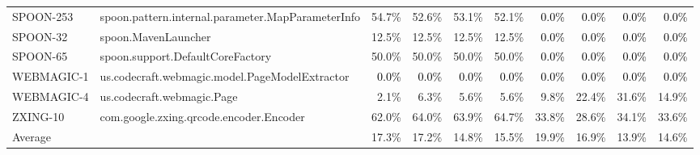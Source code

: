 \begin{tabular}{ ll rrrr rrrr}
SPOON-253  &  spoon.pattern.internal.parameter.MapParameterInfo & 54.7\% & 52.6\% & 53.1\% & 52.1\% & \cellcolor{light-gray} \textcolor{black}{0.0\%} & \cellcolor{light-gray} \textcolor{black}{0.0\%} & \cellcolor{light-gray} \textcolor{black}{0.0\%} & \cellcolor{light-gray} \textcolor{black}{0.0\%}\\ 
SPOON-32  &  spoon.MavenLauncher & 12.5\% & 12.5\% & 12.5\% & 12.5\% & \cellcolor{light-gray} \textcolor{black}{0.0\%} & \cellcolor{light-gray} \textcolor{black}{0.0\%} & \cellcolor{light-gray} \textcolor{black}{0.0\%} & \cellcolor{light-gray} \textcolor{black}{0.0\%}\\ 
SPOON-65  &  spoon.support.DefaultCoreFactory & 50.0\% & 50.0\% & 50.0\% & 50.0\% & \cellcolor{light-gray} \textcolor{black}{0.0\%} & \cellcolor{light-gray} \textcolor{black}{0.0\%} & \cellcolor{light-gray} \textcolor{black}{0.0\%} & \cellcolor{light-gray} \textcolor{black}{0.0\%}\\ 
WEBMAGIC-1  &  us.codecraft.webmagic.model.PageModelExtractor & \cellcolor{light-gray} \textcolor{black}{0.0\%} & \cellcolor{light-gray} \textcolor{black}{0.0\%} & \cellcolor{light-gray} \textcolor{black}{0.0\%} & \cellcolor{light-gray} \textcolor{black}{0.0\%} & \cellcolor{light-gray} \textcolor{black}{0.0\%} & \cellcolor{light-gray} \textcolor{black}{0.0\%} & \cellcolor{light-gray} \textcolor{black}{0.0\%} & \cellcolor{light-gray} \textcolor{black}{0.0\%}\\ 
WEBMAGIC-4  &  us.codecraft.webmagic.Page & 2.1\% & 6.3\% & 5.6\% & 5.6\% & 9.8\% & 22.4\% & 31.6\% & 14.9\%\\ 
ZXING-10  &  com.google.zxing.qrcode.encoder.Encoder & 62.0\% & 64.0\% & 63.9\% & 64.7\% & 33.8\% & 28.6\% & 34.1\% & 33.6\%\\ 
\midrule 
Average &  &  17.3\% &  17.2\% &  14.8\% &  15.5\% &  19.9\% &  16.9\% &  13.9\% &  14.6\%\\ 
\bottomrule 
\end{tabular} 
